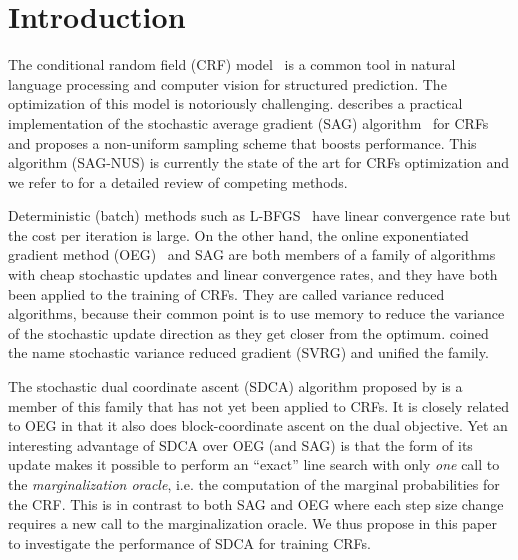 
\section{Introduction}

The conditional random field (CRF) model~\citep{lafferty2001conditional} is a common tool in natural language processing and computer vision for structured prediction.
The optimization of this model is notoriously challenging.
\citet{schmidt2015non} describes a practical implementation of the stochastic average gradient (SAG) algorithm~\citep{roux2012stochastic} for CRFs and proposes a non-uniform sampling scheme that boosts performance.
This algorithm (SAG-NUS) is currently the state of the art for CRFs optimization and we refer to \citet{schmidt2015non} for a detailed review of competing methods.

Deterministic (batch) methods such as L-BFGS~\citep{sha2003shallow,wallach2002efficient} have linear convergence rate but the cost per iteration is large.
On the other hand, the online exponentiated gradient method (OEG)~\citep{collins2008exponentiated} and SAG are both members of a family of algorithms with cheap stochastic updates and linear convergence rates, and they have both been applied to the training of CRFs.
They are called variance reduced algorithms, because their common point is to use memory to reduce the variance of the stochastic update direction as they get closer from the optimum.
\citet{johnson2013accelerating} coined the name stochastic variance reduced gradient (SVRG) and \citet{defazio2014saga} unified the family.

The stochastic dual coordinate ascent (SDCA) algorithm proposed by \citet{shalev-shwartz_stochastic_2013,shalev2016accelerated} is a member of this family that has not yet been applied to CRFs.
It is closely related to OEG in that it also does block-coordinate ascent on the dual objective.
Yet an interesting advantage of SDCA over OEG (and SAG) is that the form of its update makes it possible to perform an ``exact'' line search with only \emph{one} call to the \emph{marginalization oracle}, i.e. the computation of the marginal probabilities for the CRF.
This is in contrast to both SAG and OEG where each step size change requires a new call to the marginalization oracle.
We thus propose in this paper to investigate the performance of SDCA for training CRFs.

